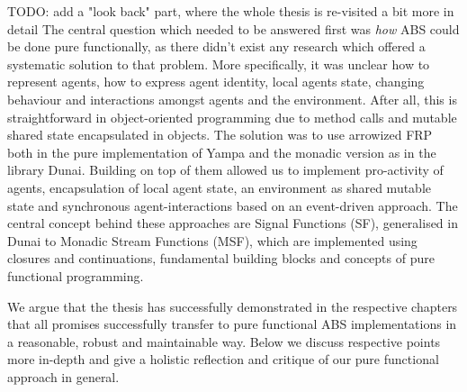 TODO: add a "look back" part, where the whole thesis is re-visited a bit more in detail
The central question which needed to be answered first was \textit{how} ABS could be done pure functionally, as there didn't exist any research which offered a systematic solution to that problem. More specifically, it was unclear how to represent agents, how to express agent identity, local agents state, changing behaviour and interactions amongst agents and the environment. After all, this is straightforward in object-oriented programming due to method calls and mutable shared state encapsulated in objects.
The solution was to use arrowized FRP both in the pure implementation of Yampa and the monadic version as in the library Dunai. Building on top of them allowed us to implement pro-activity of agents, encapsulation of local agent state, an environment as shared mutable state and synchronous agent-interactions based on an event-driven approach. The central concept behind these approaches are Signal Functions (SF), generalised in Dunai to Monadic Stream Functions (MSF), which are implemented using closures and continuations, fundamental building blocks and concepts of pure functional programming. 


We argue that the thesis has successfully demonstrated in the respective chapters that all promises successfully transfer to pure functional ABS implementations in a reasonable, robust and maintainable way. Below we discuss respective points more in-depth and give a holistic reflection and critique of our pure functional approach in general.











